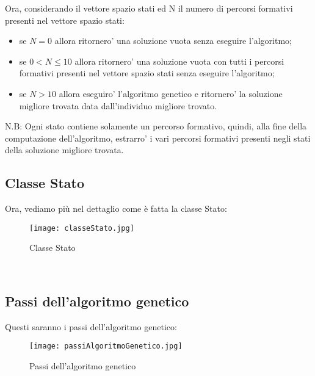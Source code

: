 \documentclass[10pt,a4paper]{article}
\begin{document}
      Ora, considerando il vettore spazio stati ed N il numero di percorsi formativi presenti nel vettore spazio stati:\\
      \begin{itemize}
        \item se $ N = 0 $ allora ritornero' una soluzione vuota senza eseguire l'algoritmo;
        \item se $ 0 < N \leq 10 $ allora ritornero' una soluzione vuota con tutti i percorsi formativi presenti nel vettore spazio stati 
        senza eseguire l'algoritmo;
        \item se $ N > 10 $ allora eseguiro' l'algoritmo genetico e ritornero' la soluzione migliore trovata data dall'individuo migliore trovato.
      \end{itemize}
      N.B: Ogni stato contiene solamente un percorso formativo, quindi, alla fine della computazione dell'algoritmo, estrarro' 
      i vari percorsi formativi presenti negli stati della soluzione migliore trovata.
     
     \subsection{Classe Stato}
       \label{passiDellAlgoritmoGeneticoSubsection}
       Ora, vediamo più nel dettaglio come è fatta la classe Stato:\\
       \begin{figure}[h!]
         \centering
         \caption{Classe Stato}
         \texttt{[image: classeStato.jpg]}
         \label{passiAlgoritmoGenetico}
       \end{figure}\\
      
      \newpage
      
    \subsection{Passi dell'algoritmo genetico}
      \label{passiDellAlgoritmoGeneticoSubsection}
      Questi saranno i passi dell'algoritmo genetico:
      \begin{figure}[h!]
        \centering
        \caption{Passi dell'algoritmo genetico}
        \texttt{[image: passiAlgoritmoGenetico.jpg]}
        \label{passiAlgoritmoGenetico}
      \end{figure}\\
            
\end{document}
